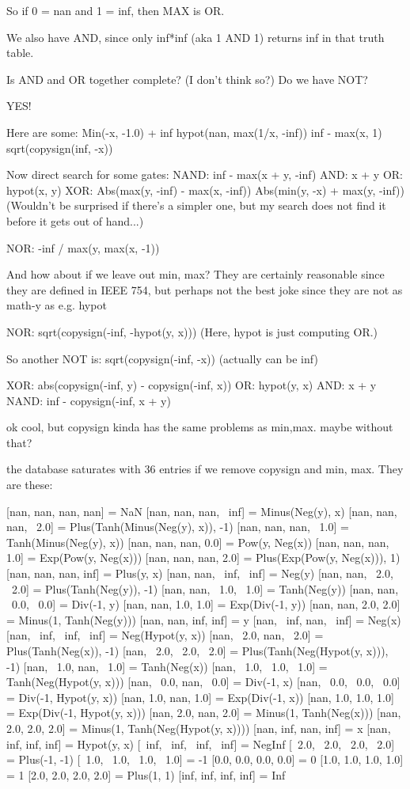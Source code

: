 \documentclass[twocolumn]{article}
\begin{document}
        So if 0 = nan and 1 = inf, then MAX is OR.

        We also have AND, since only inf*inf (aka 1 AND 1)
        returns inf in that truth table.

        Is AND and OR together complete? (I don't think so?)
        Do we have NOT?


YES!

Here are some:
Min(-x, -1.0) + inf
hypot(nan, max(1/x, -inf))
inf - max(x, 1)
sqrt(copysign(inf, -x))


Now direct search for some gates:
NAND: inf - max(x + y, -inf)
AND: x + y
OR: hypot(x, y)
XOR: Abs(max(y, -inf) - max(x, -inf))
     Abs(min(y, -x) + max(y, -inf))
     (Wouldn't be surprised if there's a simpler one,
     but my search does not find it before it gets
     out of hand...)
    
NOR: -inf / max(y, max(x, -1))
     


And how about if we leave out min, max? They are certainly
reasonable since they are defined in IEEE 754, but perhaps
not the best joke since they are not as math-y as e.g. hypot


NOR: sqrt(copysign(-inf, -hypot(y, x)))
(Here, hypot is just computing OR.)

So another NOT is:
sqrt(copysign(-inf, -x))  (actually can be inf)

XOR: abs(copysign(-inf, y) - copysign(-inf, x))
OR: hypot(y, x)
AND: x + y
NAND: inf - copysign(-inf, x + y)


ok cool, but copysign kinda has the same problems as min,max.
maybe without that?


the database saturates with 36 entries if we remove
copysign and min, max. They are these:

[nan, nan, nan, nan] = NaN
[nan, nan, nan, ~inf] = Minus(Neg(y), x)
[nan, nan, nan, ~2.0] = Plus(Tanh(Minus(Neg(y), x)), -1)
[nan, nan, nan, ~1.0] = Tanh(Minus(Neg(y), x))
[nan, nan, nan, 0.0] = Pow(y, Neg(x))
[nan, nan, nan, 1.0] = Exp(Pow(y, Neg(x)))
[nan, nan, nan, 2.0] = Plus(Exp(Pow(y, Neg(x))), 1)
[nan, nan, nan, inf] = Plus(y, x)
[nan, nan, ~inf, ~inf] = Neg(y)
[nan, nan, ~2.0, ~2.0] = Plus(Tanh(Neg(y)), -1)
[nan, nan, ~1.0, ~1.0] = Tanh(Neg(y))
[nan, nan, ~0.0, ~0.0] = Div(-1, y)
[nan, nan, 1.0, 1.0] = Exp(Div(-1, y))
[nan, nan, 2.0, 2.0] = Minus(1, Tanh(Neg(y)))
[nan, nan, inf, inf] = y
[nan, ~inf, nan, ~inf] = Neg(x)
[nan, ~inf, ~inf, ~inf] = Neg(Hypot(y, x))
[nan, ~2.0, nan, ~2.0] = Plus(Tanh(Neg(x)), -1)
[nan, ~2.0, ~2.0, ~2.0] = Plus(Tanh(Neg(Hypot(y, x))), -1)
[nan, ~1.0, nan, ~1.0] = Tanh(Neg(x))
[nan, ~1.0, ~1.0, ~1.0] = Tanh(Neg(Hypot(y, x)))
[nan, ~0.0, nan, ~0.0] = Div(-1, x)
[nan, ~0.0, ~0.0, ~0.0] = Div(-1, Hypot(y, x))
[nan, 1.0, nan, 1.0] = Exp(Div(-1, x))
[nan, 1.0, 1.0, 1.0] = Exp(Div(-1, Hypot(y, x)))
[nan, 2.0, nan, 2.0] = Minus(1, Tanh(Neg(x)))
[nan, 2.0, 2.0, 2.0] = Minus(1, Tanh(Neg(Hypot(y, x))))
[nan, inf, nan, inf] = x
[nan, inf, inf, inf] = Hypot(y, x)
[~inf, ~inf, ~inf, ~inf] = NegInf
[~2.0, ~2.0, ~2.0, ~2.0] = Plus(-1, -1)
[~1.0, ~1.0, ~1.0, ~1.0] = -1
[0.0, 0.0, 0.0, 0.0] = 0
[1.0, 1.0, 1.0, 1.0] = 1
[2.0, 2.0, 2.0, 2.0] = Plus(1, 1)
[inf, inf, inf, inf] = Inf
\end{document}
